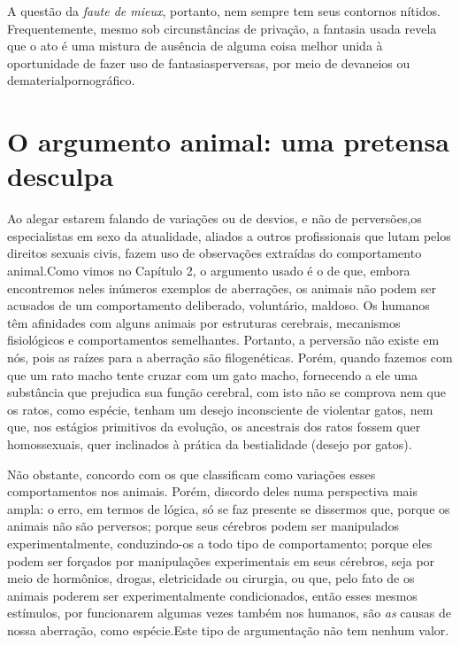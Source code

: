 A questão da \textit{faute de mieux}, portanto, nem sempre tem seus
contornos nítidos. Frequentemente, mesmo sob circunstâncias de
privação, a fantasia usada revela que o ato é uma mistura de ausência
de alguma coisa melhor unida à oportunidade de fazer uso de fantasias\idxfanta[|)]
perversas, por meio de devaneios ou de\idxfaute[|)] material\idxvariafaut[|)] pornográfico.


\section{O argumento animal: uma pretensa desculpa}

Ao alegar estarem falando de variações ou de desvios, e não de
perversões,\idxanimvers[|(] os especialistas em sexo da atualidade, aliados a outros
profissionais que lutam pelos direitos sexuais civis, fazem uso de
observações extraídas do comportamento animal.\idxaberranim[|(] Como vimos no Capítulo
2, o argumento usado é o de que, embora encontremos neles inúmeros
exemplos de aberrações, os animais não podem ser acusados de um
comportamento deliberado, voluntário, maldoso. Os humanos têm
afinidades com alguns animais por estruturas cerebrais, mecanismos
fisiológicos e comportamentos semelhantes. Portanto, a perversão não
existe em nós, pois as raízes para a aberração são filogenéticas.
Porém, quando fazemos com que um rato macho tente cruzar com um gato
macho, fornecendo a ele uma substância que prejudica sua função
cerebral, com isto não se comprova nem que os ratos, como espécie,
tenham um desejo inconsciente de violentar gatos, nem que, nos estágios
primitivos da evolução, os ancestrais dos ratos fossem quer
homossexuais, quer inclinados à prática da bestialidade (desejo por
gatos).

Não obstante, concordo com os que classificam como variações esses
comportamentos nos animais. Porém, discordo deles numa perspectiva mais
ampla: o erro, em termos de lógica, só se faz presente se dissermos
que, porque os animais não são perversos; porque seus cérebros podem
ser manipulados experimentalmente, conduzindo-os a todo tipo de
comportamento; porque eles podem ser forçados por manipulações
experimentais em seus cérebros, seja por meio de hormônios, drogas,
eletricidade ou cirurgia, ou que, pelo fato de os animais poderem ser
experimentalmente condicionados, então esses mesmos estímulos, por
funcionarem algumas vezes também nos humanos, são \textit{as} causas
de nossa aberração, como espécie.\idxaberranim[|)] Este tipo de argumentação não tem
nenhum valor.

